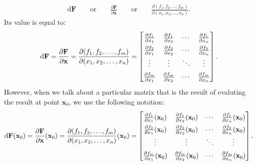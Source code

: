\documentclass[10pt]{article}
\newcommand{\dee}{\mathrm{d}}
\newcommand{\ve}[1]{\mathbf{#1}}
\begin{document}
\begin{itemize}
\begin{align*}
      \dee \ve{F} \qquad \mbox{or} \qquad \frac{\partial \ve{F}}{\partial \ve{x}} \qquad \mbox{or} \qquad \frac{\partial (f_1, f_2, \dots, f_m)}{\partial(x_1, x_2, \dotsc, x_n)}.
    \end{align*}
    Its value is equal to:
    \begin{align*}
      \renewcommand{\arraystretch}{1.5}
      \dee \ve{F} = \frac{\partial \ve{F}}{\partial \ve{x}} = \frac{\partial (f_1, f_2, \dots, f_m)}{\partial(x_1, x_2, \dotsc, x_n)} = 
      \begin{bmatrix}
        \frac{\partial f_1}{\partial x_1} & \frac{\partial f_1}{\partial x_2} & \cdots  & \frac{\partial f_1}{\partial x_n}\\
        \frac{\partial f_2}{\partial x_1} & \frac{\partial f_2}{\partial x_2} & \cdots  & \frac{\partial f_2}{\partial x_n}\\
        \vdots & \vdots & \ddots & \vdots \\
        \frac{\partial f_m}{\partial x_1} & \frac{\partial f_m}{\partial x_2} & \cdots  & \frac{\partial f_m}{\partial x_n}
      \end{bmatrix}.
    \end{align*}
    However, when we talk about a particular matrix that is the result of evaluting the result at point $\ve{x}_0$, we use the following notation:
    \begin{align*}
      \renewcommand{\arraystretch}{1.5}
      \dee \ve{F}(\ve{x}_0) = \frac{\partial \ve{F}}{\partial \ve{x}}(\ve{x}_0) = \frac{\partial (f_1, f_2, \dots, f_m)}{\partial(x_1, x_2, \dotsc, x_n)}(\ve{x}_0) = 
      \begin{bmatrix}
        \frac{\partial f_1}{\partial x_1}(\ve{x}_0) & \frac{\partial f_1}{\partial x_2}(\ve{x}_0) & \cdots  & \frac{\partial f_1}{\partial x_n}(\ve{x}_0)\\
        \frac{\partial f_2}{\partial x_1}(\ve{x}_0) & \frac{\partial f_2}{\partial x_2}(\ve{x}_0) & \cdots  & \frac{\partial f_2}{\partial x_n}(\ve{x}_0)\\
        \vdots & \vdots & \ddots & \vdots \\
        \frac{\partial f_m}{\partial x_1}(\ve{x}_0) & \frac{\partial f_m}{\partial x_2}(\ve{x}_0) & \cdots  & \frac{\partial f_m}{\partial x_n}(\ve{x}_0)
      \end{bmatrix}.
    \end{align*}


\end{itemize}
\end{document}
